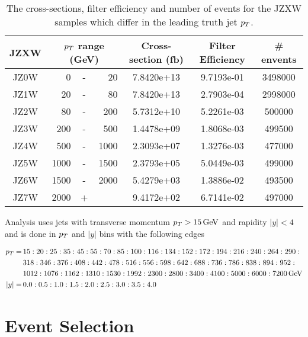 \begin{table}
  \centering
  \begin{tabular}{|c|rcr|c|c|c|}
    \hline 
     JZXW & \multicolumn{3}{|c|}{$p_{T}$ range (GeV)} & Cross-section (fb) & Filter Efficiency & \# envents  \\ 
    \hline
    \hline
		 JZ0W &     0 & - &    20 & 7.8420e+13 & 9.7193e-01 & 3498000 \\ 
    \hline
		 JZ1W &    20 & - &    80 & 7.8420e+13 & 2.7903e-04 & 2998000 \\
    \hline
		 JZ2W &    80 & - &   200 & 5.7312e+10 & 5.2261e-03 & 500000  \\
    \hline
		 JZ3W &   200 & - &   500 & 1.4478e+09 & 1.8068e-03 & 499500  \\
    \hline
		 JZ4W &   500 & - &  1000 & 2.3093e+07 & 1.3276e-03 & 477000  \\
    \hline
		 JZ5W &  1000 & - &  1500 & 2.3793e+05 & 5.0449e-03 & 499000  \\
    \hline
		 JZ6W &  1500 & - &  2000 & 5.4279e+03 & 1.3886e-02 & 493500  \\
    \hline
		 JZ7W &  2000 & + &       & 9.4172e+02 & 6.7141e-02 & 497000  \\
    \hline 
  \end{tabular}
  \caption{The cross-sections, filter efficiency and number of events for the JZXW samples which differ in the leading truth jet $p_{T}$.}
  \label{tab:JZXW}
\end{table}

Analysis uses jets with transverse momentum $p_{T} > 15\,\text{GeV}$ and rapidity $|y| <
4$ and is done in $p_{T}$ and $|y|$ bins with the following edges

\small
\begin{align}
  p_{T} = \, &15:20:25:35:45:55:70:85:100:116:134:152:172:194:216:240:264:290: \nonumber \\
        &318:346:376:408:442:478:516:556:598:642:688:736:786:838:894:952: \nonumber \\
        &1012:1076:1162:1310:1530:1992:2300:2800:3400:4100:5000:6000:7200 \,\text{GeV} \nonumber \\
  |y| = \, &0.0:0.5:1.0:1.5:2.0:2.5:3.0:3.5:4.0
  \label{eq:Binning}
\end{align}
\normalsize

\section{Event Selection}

